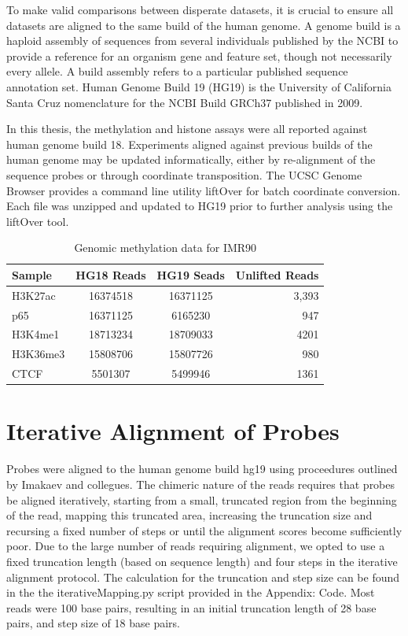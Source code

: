 \documentclass[phd,tocprelim]{cornell}
\begin{document}
To make valid comparisons between disperate datasets, it is crucial to ensure all datasets are aligned to the same
build of the human genome.  A genome build is a haploid assembly of sequences from several individuals published by
the NCBI to provide a reference for an organism gene and feature set, though not necessarily every allele.  A build assembly
refers to a particular published sequence annotation set.  Human Genome Build 19 (HG19) is the University of California Santa
Cruz nomenclature for the NCBI Build GRCh37 published in 2009\cite{NCBI2015}.

In this thesis, the methylation and histone assays were all reported against human genome build 18.  Experiments aligned
against previous builds of the human genome may be updated informatically, either by re-alignment of the
sequence probes or through coordinate transposition.  The UCSC Genome Browser provides a command line utility liftOver for
batch coordinate conversion.  Each file was unzipped and updated to HG19 prior to further analysis using the liftOver tool.

\begin{table}
  \centering
  \begin{tabular}{lccr}
    \hline
    Sample & HG18 Reads & HG19 Seads & Unlifted Reads \\ \hline
    H3K27ac & 16374518 & 16371125 & 3,393 \\
    p65 & 16371125 & 6165230 & 947 \\
    H3K4me1 & 18713234 & 18709033 & 4201 \\
    H3K36me3 & 15808706 & 15807726 & 980 \\
    CTCF & 5501307 & 5499946 & 1361 \\
    \hline
  \end{tabular}
  \caption{Genomic methylation data for IMR90}
\end{table}

\chapter{Iterative Alignment of Probes}

Probes were aligned to the human genome build hg19 using proceedures outlined by
Imakaev and collegues\cite{imakaev2012}.  The chimeric nature of the reads
requires that probes be aligned iteratively, starting from a small, truncated
region from the beginning of the read, mapping this truncated area, increasing
the truncation size and recursing a fixed number of steps or until the alignment
scores become sufficiently poor.  Due to the large number of reads requiring
alignment, we opted to use a fixed truncation length (based on sequence length)
and four steps in the iterative alignment protocol.  The calculation
for the truncation and step size can be found in the the iterativeMapping.py
script provided in the Appendix: Code.  Most reads were 100 base pairs, resulting
in an initial truncation length of 28 base pairs, and step size of 18 base pairs.
\end{document}

